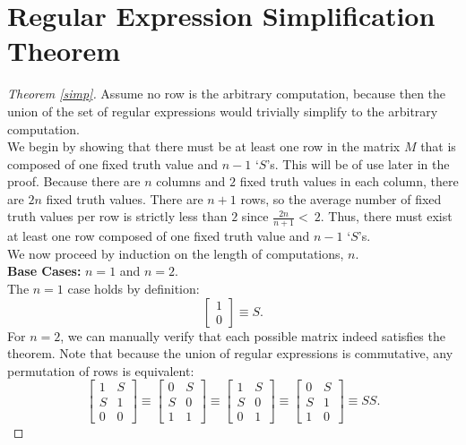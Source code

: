\documentclass[runningheads]{llncs}
\begin{document}
\section{Regular Expression Simplification Theorem} \label{simp appendix}
\begin{proof}[Theorem \ref{simp}]
Assume no row is the arbitrary computation, because then the union of the set of regular expressions would trivially simplify to the arbitrary computation.\\
We begin by showing that there must be at least one row in the matrix $M$ that is composed of one fixed truth value and $n-1$ `$S$'s. This will be of use later in the proof. Because there are $n$ columns and $2$ fixed truth values in each column, there are $2n$ fixed truth values. There are $n+1$ rows, so the average number of fixed truth values per row is strictly less than $2$ since $\frac{2n}{n+1} < \ 2$.
Thus, there must exist at least one row composed of one fixed truth value and $n-1$ `$S$'s. \\
\noindent We now proceed by induction on the length of computations, $n$. \\
\textbf{Base Cases:} $n=1$ and $n=2$. \\
The $n=1$ case holds by definition:
    $$\begin{bmatrix}
    1\\
    0
    \end{bmatrix}  \equiv S.$$
For $n=2$, we can manually verify that each possible matrix indeed satisfies the theorem. Note that because the union of regular expressions is commutative, any permutation of rows is equivalent:
        $$\begin{bmatrix}
    1 & S\\
    S & 1\\
    0 & 0
    \end{bmatrix}  \equiv \begin{bmatrix}
    0 & S\\
    S & 0\\
    1 & 1
    \end{bmatrix} \equiv \begin{bmatrix}
    1 & S\\
    S & 0\\
    0 & 1
    \end{bmatrix} \equiv \begin{bmatrix}
    0 & S\\
    S & 1\\
    1 & 0
    \end{bmatrix} \equiv SS.
$$
\end{proof}
\end{document}
